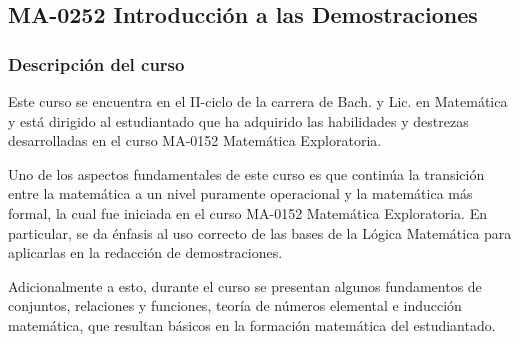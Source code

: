 


\newpage
\subsection*{MA-0252 Introducción a las Demostraciones}

\hypertarget{MA0252}{}
\begin{refsection}
\begin{table}[H]
\end{table}


\subsubsection*{Descripción del curso}

Este curso se encuentra en el II-ciclo de la carrera de Bach. y Lic. en Matemática y está dirigido al estudiantado que ha adquirido las habilidades y destrezas desarrolladas en el curso MA-0152 Matemática Exploratoria.

Uno de los aspectos fundamentales de este curso es que continúa la transición entre la matemática a un nivel puramente operacional y la matemática más formal, la cual fue iniciada en el curso MA-0152 Matemática Exploratoria. En particular, se da énfasis al uso correcto de las bases de la Lógica Matemática para aplicarlas en la redacción de demostraciones. 

Adicionalmente a esto, durante el curso se presentan algunos fundamentos de conjuntos, relaciones y funciones, teoría de números elemental e inducción matemática, que resultan básicos en la formación matemática del estudiantado.


\end{refsection}
